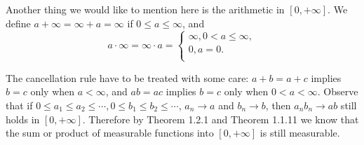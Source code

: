 Another thing we would like to mention here is the arithmetic in $[0,+\infty]$. We define $a+\infty=\infty+a=\infty$ if $0\le a\le\infty$, and 
$$
a\cdot \infty =\infty \cdot a=\begin{cases}
	\infty ,0<a\le \infty ,\\
	0,a=0.\\
\end{cases}
$$\par
The cancellation rule have to be treated with some care: $a+b=a+c$ implies $b=c$ only when $a<\infty$, and $ab=ac$ implies $b=c$ only when $0<a<\infty$. Observe that if $0\le a_1\le a_2\le\cdots,0\le b_1\le b_2\le\cdots$, $a_n\to a$ and $b_n\to b$, then $a_nb_n\to ab$ still holds in $[0,+\infty]$. Therefore by Theorem 1.2.1 and Theorem 1.1.11 we know that the sum or product of measurable functions into $[0,+\infty]$ is still measurable.
